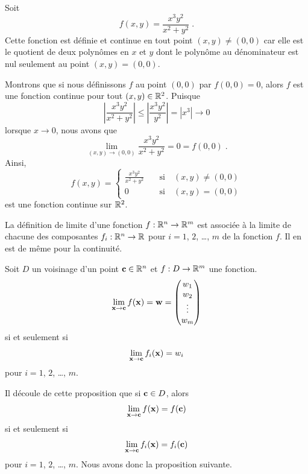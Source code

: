 {\begin{egg}
Soit
\[
f(x,y) = \frac{x^3y^2}{x^2+y^2} \; .
\]
Cette fonction est définie et continue en tout point $(x,y)\neq (0,0)$
car elle est le quotient de deux polynômes en $x$ et $y$ dont le
polynôme au dénominateur est nul seulement au point $(x,y) = (0,0)$.

Montrons que si nous définissons $f$ au point $(0,0)$ par $f(0,0)=0$, alors
$f$ est une fonction continue pour tout $(x,y)\in \mathbb{R}^2$. Puisque
\[
\left| \frac{x^3y^2}{x^2+y^2} \right| \leq
\left| \frac{x^3y^2}{y^2} \right| = |x^3| \rightarrow 0
\]
lorsque $x\rightarrow 0$, nous avons que
\[
\lim_{(x,y)\rightarrow (0,0)} \frac{x^3y^2}{x^2+y^2} = 0 = f(0,0) \; .
\]
Ainsi,
\[
f(x,y) = \begin{cases}
\displaystyle \frac{x^3y^2}{x^2+y^2} & \quad \text{si} \quad (x,y)\neq (0,0) \\
0 & \quad \text{si} \quad (x,y)= (0,0)
\end{cases}
\]
est une fonction continue sur $\mathbb{R}^2$.
\end{egg}


La définition de limite d'une fonction $f:\mathbb{R}^n \rightarrow \mathbb{R}^m$ est
associée à la limite de chacune des composantes
$f_i:\mathbb{R}^n\rightarrow \mathbb{R}$ pour $i=1$, $2$, \ldots, $m$ de la fonction
$f$.  Il en est de même pour la continuité.

\begin{focus}{\prp}
Soit $D$ un voisinage d'un point $\mathbf{c} \in \mathbb{R}^n$ et
$f:D\rightarrow \mathbb{R}^m$ une fonction.
\[
\lim_{\mathbf{x}\rightarrow \mathbf{c}} f(\mathbf{x}) = \mathbf{w} =
\begin{pmatrix} w_1 \\ w_2 \\ \vdots \\ w_m \end{pmatrix}
\]
si et seulement si
\[
\lim_{\mathbf{x}\rightarrow \mathbf{c}} f_i(\mathbf{x}) = w_i
\]
pour $i=1$, $2$, \ldots, $m$.
\end{focus}

Il découle de cette proposition que si $\mathbf{c} \in D$, alors
\[
\lim_{\mathbf{x}\rightarrow \mathbf{c}} f(\mathbf{x}) = f(\mathbf{c})
\]
si et seulement si
\[
\lim_{\mathbf{x}\rightarrow \mathbf{c}} f_i(\mathbf{x}) = f_i(\mathbf{c})
\]
pour $i=1$, $2$, \ldots, $m$.  Nous avons donc la proposition suivante.

}

